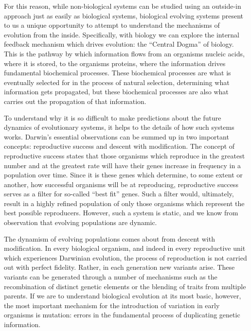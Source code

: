 For this reason, while non-biological systems can be studied using an outside-in approach just as easily as biological systems, biological evolving systems present to us a unique opportunity to attempt to understand the mechanisms of evolution from the inside. Specifically, with biology we can explore the internal feedback mechanism which drives evolution: the ``Central Dogma'' of biology. This is the pathway by which information flows from an organisms nucleic acids, where it is stored, to the organisms proteins, where the information drives fundamental biochemical processes. These biochemical processes are what is eventually selected for in the process of natural selection, determining what information gets propagated, but these biochemical processes are also what carries out the propagation of that information.

To understand why it is so difficult to make predictions about the future dynamics of evolutionary systems, it helps to the details of how such systems works. Darwin's essential observations can be summed up in two important concepts: reproductive success and descent with modification. The concept of reproductive success states that those organisms which reproduce in the greatest number and at the greatest rate will have their genes increase in frequency in a population over time. Since it is these genes which determine, to some extent or another, how successful organisms will be at reproducing, reproductive success serves as a filter for so-called ``best fit'' genes. Such a filter would, ultimately, result in a highly refined population of only those organisms which represent the best possible reproducers. However, such a system is static, and we know from observation that evolving populations are dynamic.

The dynamism of evolving populations comes about from descent with modification. In every biological organism, and indeed in every reproductive unit which experiences Darwinian evolution, the process of reproduction is not carried out with perfect fidelity. Rather, in each generation new variants arise. These variants can be generated through a number of mechanisms such as the recombination of distinct genetic elements or the blending of traits from multiple parents. If we are to understand biological evolution at its most basic, however, the most important mechanism for the introduction of variation in early organisms is mutation: errors in the fundamental process of duplicating genetic information.


